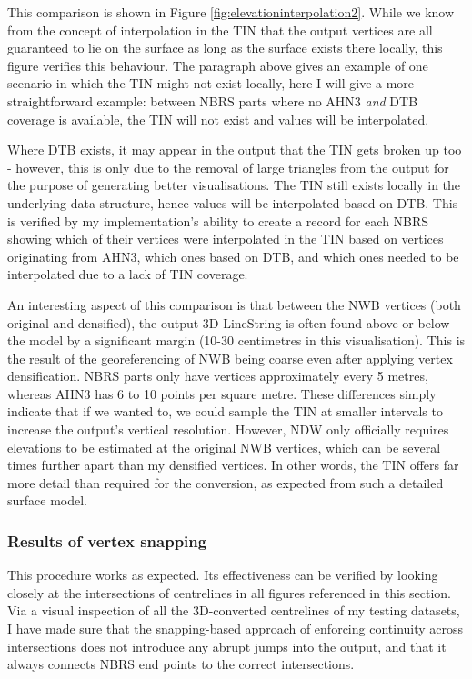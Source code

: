 This comparison is shown in Figure \ref{fig:elevationinterpolation2}. While we know from the concept of interpolation in the TIN that the output vertices are all guaranteed to lie on the surface as long as the surface exists there locally, this figure verifies this behaviour. The paragraph above gives an example of one scenario in which the TIN might not exist locally, here I will give a more straightforward example: between NBRS parts where no AHN3 \textit{and} DTB coverage is available, the TIN will not exist and values will be interpolated.

Where DTB exists, it may appear in the output that the TIN gets broken up too - however, this is only due to the removal of large triangles from the output for the purpose of generating better visualisations. The TIN still exists locally in the underlying data structure, hence values will be interpolated based on DTB. This is verified by my implementation's ability to create a record for each NBRS showing which of their vertices were interpolated in  the TIN based on vertices originating from AHN3, which ones based on DTB, and which ones needed to be interpolated due to a lack of TIN coverage.

An interesting aspect of this comparison is that between the NWB vertices (both original and densified), the output 3D LineString is often found above or below the model by a significant margin (10-30 centimetres in this visualisation). This is the result of the georeferencing of NWB being coarse even after applying vertex densification. NBRS parts only have vertices approximately every 5 metres, whereas AHN3 has 6 to 10 points per square metre. These differences simply indicate that if we wanted to, we could sample the TIN at smaller intervals to increase the output's vertical resolution. However, NDW only officially requires elevations to be estimated at the original NWB vertices, which can be several times further apart than my densified vertices. In other words, the TIN offers far more detail than required for the conversion, as expected from such a detailed surface model.

\subsubsection{Results of vertex snapping}

This procedure works as expected. Its effectiveness can be verified by looking closely at the intersections of centrelines in all figures referenced in this section. Via a visual inspection of all the 3D-converted centrelines of my testing datasets, 
I have made sure that the snapping-based approach of enforcing continuity across intersections does not introduce any abrupt jumps into the output, and that it always connects NBRS end points to the correct intersections.

